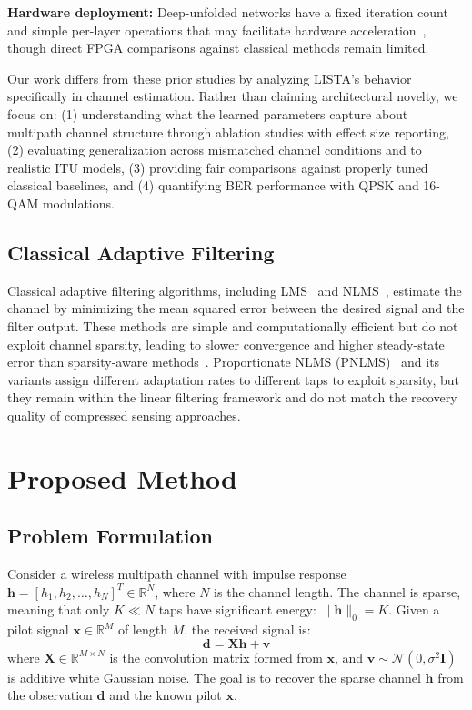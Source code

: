 \documentclass[a4paper,fleqn]{cas-sc}
\begin{document}
\textbf{Hardware deployment:} Deep-unfolded networks have a fixed iteration count and simple per-layer operations that may facilitate hardware acceleration~\citep{monga2021algorithm}, though direct FPGA comparisons against classical methods remain limited.

Our work differs from these prior studies by analyzing LISTA's behavior specifically in channel estimation. Rather than claiming architectural novelty, we focus on: (1) understanding what the learned parameters capture about multipath channel structure through ablation studies with effect size reporting, (2) evaluating generalization across mismatched channel conditions and to realistic ITU models, (3) providing fair comparisons against properly tuned classical baselines, and (4) quantifying BER performance with QPSK and 16-QAM modulations.

\subsection{Classical Adaptive Filtering}

Classical adaptive filtering algorithms, including LMS~\citep{widrow1960adaptive} and NLMS~\citep{nagumo1967weight}, estimate the channel by minimizing the mean squared error between the desired signal and the filter output. These methods are simple and computationally efficient but do not exploit channel sparsity, leading to slower convergence and higher steady-state error than sparsity-aware methods~\citep{sayed2003fundamentals}. Proportionate NLMS (PNLMS)~\citep{duttweiler2000proportionate} and its variants assign different adaptation rates to different taps to exploit sparsity, but they remain within the linear filtering framework and do not match the recovery quality of compressed sensing approaches.


\section{Proposed Method}\label{sec:method}

\subsection{Problem Formulation}

Consider a wireless multipath channel with impulse response $\mathbf{h} = [h_1, h_2, \ldots, h_N]^T \in \mathbb{R}^N$, where $N$ is the channel length. The channel is sparse, meaning that only $K \ll N$ taps have significant energy: $\|\mathbf{h}\|_0 = K$. Given a pilot signal $\mathbf{x} \in \mathbb{R}^M$ of length $M$, the received signal is:
\begin{equation}\label{eq:observation}
\mathbf{d} = \mathbf{X} \mathbf{h} + \mathbf{v}
\end{equation}
where $\mathbf{X} \in \mathbb{R}^{M \times N}$ is the convolution matrix formed from $\mathbf{x}$, and $\mathbf{v} \sim \mathcal{N}(0, \sigma^2 \mathbf{I})$ is additive white Gaussian noise. The goal is to recover the sparse channel $\mathbf{h}$ from the observation $\mathbf{d}$ and the known pilot $\mathbf{x}$.
\end{document}
